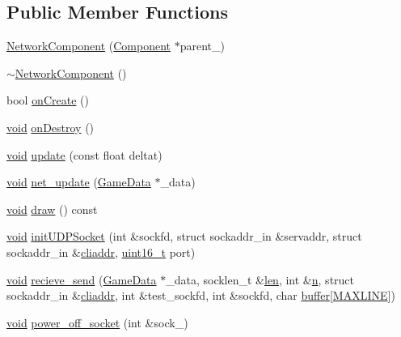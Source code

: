 \subsection*{Public Member Functions}
\begin{DoxyCompactItemize}
\item 
\hyperlink{classNetworkComponent_ac1538e812d154f87406f11ae3d2083ff}{Network\+Component} (\hyperlink{classComponent}{Component} $\ast$parent\+\_\+)
\item 
\hyperlink{classNetworkComponent_a05adbdf1cb3611bbfd937887065d3feb}{$\sim$\+Network\+Component} ()
\item 
bool \hyperlink{classNetworkComponent_afe34eefd95bb82a8496c856a19e0f153}{on\+Create} ()
\item 
\hyperlink{imgui__impl__opengl3__loader_8h_ac668e7cffd9e2e9cfee428b9b2f34fa7}{void} \hyperlink{classNetworkComponent_a3361f9b02b8b5c0bed3beb4d70c28bdb}{on\+Destroy} ()
\item 
\hyperlink{imgui__impl__opengl3__loader_8h_ac668e7cffd9e2e9cfee428b9b2f34fa7}{void} \hyperlink{classNetworkComponent_ae731efcb319689aa9848ad8631ddfffc}{update} (const float deltat)
\item 
\hyperlink{imgui__impl__opengl3__loader_8h_ac668e7cffd9e2e9cfee428b9b2f34fa7}{void} \hyperlink{classNetworkComponent_ad4521efc1612c9c8731c775060c78687}{net\+\_\+update} (\hyperlink{structGameData}{Game\+Data} $\ast$\+\_\+data)
\item 
\hyperlink{imgui__impl__opengl3__loader_8h_ac668e7cffd9e2e9cfee428b9b2f34fa7}{void} \hyperlink{classNetworkComponent_a43dbac0f78d86a74c3b22006db82b0e8}{draw} () const
\item 
\hyperlink{imgui__impl__opengl3__loader_8h_ac668e7cffd9e2e9cfee428b9b2f34fa7}{void} \hyperlink{classNetworkComponent_ac9b1363974a7c04d37c662c152a956d5}{init\+U\+D\+P\+Socket} (int \&sockfd, struct sockaddr\+\_\+in \&servaddr, struct sockaddr\+\_\+in \&\hyperlink{classNetworkComponent_a95a10a88ae17cf254463cf4939ccc76a}{cliaddr}, \hyperlink{stdint_8h_a273cf69d639a59973b6019625df33e30}{uint16\+\_\+t} port)
\item 
\hyperlink{imgui__impl__opengl3__loader_8h_ac668e7cffd9e2e9cfee428b9b2f34fa7}{void} \hyperlink{classNetworkComponent_a3ebbb8337b471ad872eede4e76cd2b45}{recieve\+\_\+send} (\hyperlink{structGameData}{Game\+Data} $\ast$\+\_\+data, socklen\+\_\+t \&\hyperlink{classNetworkComponent_a728a0d61e8d3ad43db43caf54f84cf00}{len}, int \&\hyperlink{classNetworkComponent_ae32524115fa63fc34086d31c951847f6}{n}, struct sockaddr\+\_\+in \&\hyperlink{classNetworkComponent_a95a10a88ae17cf254463cf4939ccc76a}{cliaddr}, int \&test\+\_\+sockfd, int \&sockfd, char \hyperlink{imgui__impl__opengl3__loader_8h_a3667f558219c90437106b544a3ca00b8}{buffer}\mbox{[}\hyperlink{game_8h_a3e937c42922f7601edb17b747602c471}{M\+A\+X\+L\+I\+NE}\mbox{]})
\item 
\hyperlink{imgui__impl__opengl3__loader_8h_ac668e7cffd9e2e9cfee428b9b2f34fa7}{void} \hyperlink{classNetworkComponent_a54fabbd4719383d31abd1262e279683e}{power\+\_\+off\+\_\+socket} (int \&sock\+\_\+)
\end{DoxyCompactItemize}
